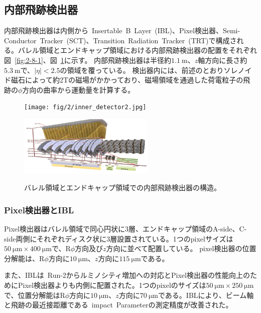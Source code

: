 \subsection{内部飛跡検出器}\label{2-2-3}
内部飛跡検出器は内側から~Insertable~B~Layer~(IBL)、Pixel検出器、Semi-Conductor~Tracker~(SCT)、Transition~Radiation~Tracker~(TRT)で構成される。バレル領域とエンドキャップ領域における内部飛跡検出器の配置をそれぞれ図~\ref{fig:2-8-1}、図~\ref{fig:2-8-2}に示す。
内部飛跡検出器は半径約$\SI{1.1}{\m}$、$z$軸方向に長さ約$\SI{5.3}{\m}$で、$|\eta|<2.5$の領域を覆っている。
検出器内には、前述のとおりソレノイド磁石によって約2Tの磁場がかかっており、磁場領域を通過した荷電粒子の飛跡の$\phi$方向の曲率から運動量を計算する。

\begin{figure}[h]
  \begin{minipage}[b]{0.48\linewidth}
      \centering
      \texttt{[image: fig/2/inner\_detector2.jpg]}
      \label{fig:2-8-1}
  \end{minipage}
    \begin{minipage}[b]{0.48\linewidth}
      \centering
      \includegraphics[clip, width=6.5cm]{fig/2/inner_detector3.png}
      \label{fig:2-8-2}
  \end{minipage}
  \caption{バレル領域とエンドキャップ領域での内部飛跡検出器の構造\cite{Aad:1129811}。}
\end{figure}

\subsubsection{Pixel検出器とIBL}
Pixel検出器はバレル領域で同心円状に3層、エンドキャップ領域のA-side、C-side両側にそれぞれディスク状に3層設置されている。1つのpixelサイズは$\SI{50}{\um} \times \SI{400}{\um}$で、R$\phi$方向及び$z$方向に並べて配置している。
pixel検出器の位置分解能は、R$\phi$方向に$\SI{10}{\um}$、$z$方向に$\SI{115}{\um}$である。

また、IBLは~Run-2からルミノシティ増加への対応とPixel検出器の性能向上のためにPixel検出器よりも内側に配置された。1つのpixelのサイズは$\SI{50}{\um} \times \SI{250}{\um}$で、位置分解能はR$\phi$方向に$\SI{10}{\um}$、$z$方向に$\SI{70}{\um}$である。IBLにより、ビーム軸と飛跡の最近接距離である~impact~Parameterの測定精度が改善された。

